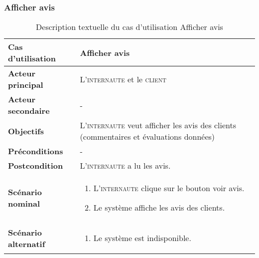         \subsubsection[Consulter avis]{Afficher avis}
            \begin{longtable}{p{4cm} p{9cm}}
                \caption{Description textuelle du cas d’utilisation Afficher avis}
                \label{table:usecaseConsulterAvis}
                \\\hline\hline
                    \textbf{Cas d’utilisation} & \textbf{Afficher avis}
                \\\hline\hline
                        \textbf{Acteur principal} & L’\textsc{internaute} et le \textsc{client}
                    \\
                        \textbf{Acteur secondaire} & -
                    \\
                        \textbf{Objectifs} & L’\textsc{internaute} veut afficher les
                        avis des clients (commentaires et évaluations données)
                    \\
                        \textbf{Préconditions} & -
                    \\
                    \textbf{Postcondition} & L’\textsc{internaute} a lu les avis.
                    \\
                    \textbf{Scénario nominal} &
                        \begin{enumerate}[leftmargin=*]
                            \item L’\textsc{internaute} clique sur le bouton
                            voir avis.
                            \item Le système affiche les avis des clients.
                        \end{enumerate}
                    \\
                    \textbf{Scénario alternatif} &
                        \begin{enumerate}[leftmargin=*]
                            \item Le système est indisponible.
                        \end{enumerate}
                \\\bottomrule
            \end{longtable}

